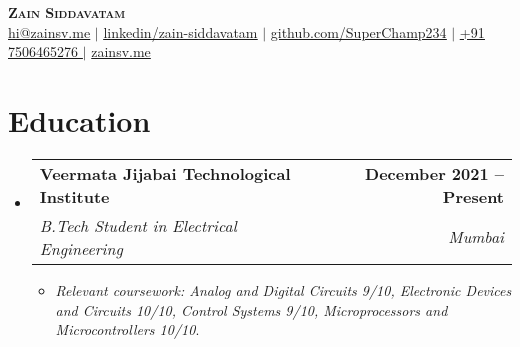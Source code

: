 \documentclass[letterpaper,11pt]{article}
\makeatletter
\newcommand{\resumeItem}[1]{
  \item\small{
    {#1 \vspace{-2pt}}
  }
}
\newcommand{\resumeSubheading}[4]{
  \vspace{-2pt}\item
    \begin{tabular*}{1.0\textwidth}[t]{l@{\extracolsep{\fill}}r}
      \textbf{#1} & \textbf{\small #2} \\
      \textit{\small#3} & \textit{\small #4} \\
    \end{tabular*}\vspace{-7pt}
}
\newcommand{\resumeSubHeadingListStart}{\begin{itemize}[leftmargin=0.0in, label={}]}
\newcommand{\resumeSubHeadingListEnd}{\end{itemize}}
\newcommand{\resumeItemListStart}{\begin{itemize}}
\newcommand{\resumeItemListEnd}{\end{itemize}\vspace{-5pt}}
\makeatother
\begin{document}
\begin{center}
  \textbf{\Huge \scshape Zain Siddavatam} \\ \vspace{1pt}
  \href{mailto:hi@zainsv.me}{\underline{hi@zainsv.me}} $|$
  \href{https://www.linkedin.com/in/zain-siddavatam/}{\underline{linkedin/zain-siddavatam}} $|$
  \href{https://github.com/SuperChamp234}{\underline{github.com/SuperChamp234}} $|$
  \href{}{\underline{+91 7506465276 }} $|$
  \href{https://zainsv.me}{zainsv.me}
\end{center}

\section{Education}
\resumeSubHeadingListStart
\resumeSubheading
{Veermata Jijabai Technological Institute}{December 2021 -- Present}
{B.Tech Student in Electrical Engineering}{Mumbai}
\resumeItemListStart
\resumeItem{\textit{Relevant coursework: Analog and Digital Circuits 9/10, Electronic Devices and Circuits 10/10, Control Systems 9/10, Microprocessors and Microcontrollers 10/10}.}
\resumeItemListEnd
\resumeSubHeadingListEnd

\end{document}
